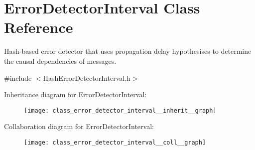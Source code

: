 \hypertarget{class_error_detector_interval}{}\section{Error\+Detector\+Interval Class Reference}
\label{class_error_detector_interval}


Hash-\/based error detector that uses propagation delay hypothesises to determine the causal dependencies of messages.  




{\ttfamily \#include $<$Hash\+Error\+Detector\+Interval.\+h$>$}



Inheritance diagram for Error\+Detector\+Interval\+:\nopagebreak
\begin{figure}[H]
\begin{center}
\leavevmode
\texttt{[image: class\_error\_detector\_interval\_\_inherit\_\_graph]}
\end{center}
\end{figure}


Collaboration diagram for Error\+Detector\+Interval\+:\nopagebreak
\begin{figure}[H]
\begin{center}
\leavevmode
\texttt{[image: class\_error\_detector\_interval\_\_coll\_\_graph]}
\end{center}
\end{figure}
